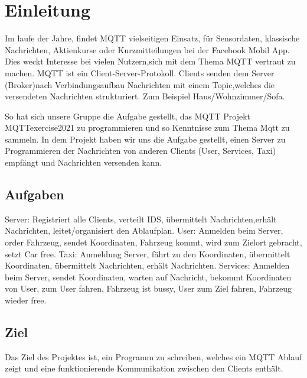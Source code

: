 \section{Einleitung}


Im laufe der Jahre, findet MQTT vielseitigen Einsatz, für Sensordaten, klassische Nachrichten, Aktienkurse oder Kurzmitteilungen bei der Facebook Mobil App.
Dies weckt Interesse bei vielen Nutzern,sich mit dem Thema MQTT vertraut zu machen.
MQTT ist ein Client-Server-Protokoll.
Clients senden dem Server (Broker)nach Verbindungsaufbau Nachrichten mit einem Topic,welches die versendeten Nachrichten strukturiert. 
Zum Beispiel Haus/Wohnzimmer/Sofa.

So hat sich unsere Gruppe die Aufgabe gestellt, das MQTT Projekt MQTTexercise2021 zu programmieren und so Kenntnisse zum Thema Mqtt zu sammeln.
In dem Projekt haben wir uns die Aufgabe gestellt, einen Server zu Programmieren der Nachrichten von anderen Clients (User, Services, Taxi) empfängt und Nachrichten versenden kann.

\subsection{Aufgaben}

Server: Registriert alle Clients, verteilt IDS, übermittelt Nachrichten,erhält Nachrichten, leitet/organisiert den Ablaufplan.
User: Anmelden beim Server, order Fahrzeug, sendet Koordinaten, Fahrzeug kommt, wird zum Zielort gebracht, setzt Car free.
Taxi: Anmeldung Server, fährt zu den Koordinaten, übermittelt Koordinaten, übermittelt Nachrichten, erhält Nachrichten.
Services: Anmelden beim Server, sendet Koordinaten, warten auf Nachricht, bekommt Koordinaten von User, zum User fahren, Fahrzeug ist  bussy, User zum Ziel fahren, Fahrzeug wieder free.

\subsection{Ziel}

Das Ziel des Projektes ist, ein Programm zu schreiben, welches ein MQTT Ablauf zeigt und eine funktionierende Kommunikation zwischen den Clients enthält.

